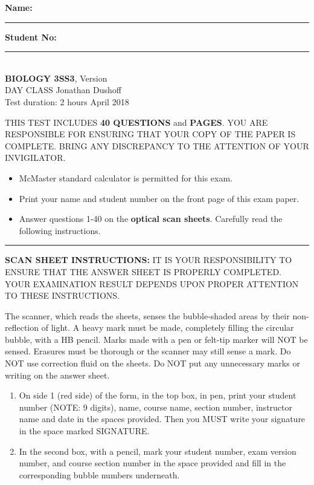 
\thispagestyle{empty}
\textbf{Name:} \rule{5cm}{1pt} \hfill \textbf{Student No:} \rule{5cm}{1pt} \\

\bigskip\noindent \hfill {\large {\bf BIOLOGY 3SS3}, Version \testver} \hspace*{\fill} \\
DAY CLASS  \hfill Jonathan Dushoff \\
Test duration: 2 hours \hfill April 2018

{\small

\medskip\noindent THIS TEST INCLUDES {\bf 40 QUESTIONS} and \textbf{\pageref{LastPage} PAGES}. YOU ARE RESPONSIBLE FOR ENSURING THAT YOUR COPY OF THE PAPER IS COMPLETE. BRING ANY DISCREPANCY TO THE ATTENTION OF YOUR INVIGILATOR. 

\begin{itemize}
\item McMaster standard calculator is permitted for this exam.
\item Print your name and student number on the front page of this exam paper.
\item Answer questions 1-40 on the \textbf{optical scan sheets}.  Carefully read the following instructions.
\end{itemize}
\hrule
\bigskip\textbf{SCAN SHEET INSTRUCTIONS:} 
IT IS YOUR RESPONSIBILITY TO ENSURE THAT THE ANSWER SHEET IS PROPERLY COMPLETED. YOUR EXAMINATION RESULT DEPENDS UPON PROPER ATTENTION TO THESE INSTRUCTIONS.

The scanner, which reads the sheets, senses the bubble-shaded areas by their non-reflection of light.  A heavy mark must be made, completely filling the circular bubble, with a HB pencil.  Marks made with a pen or felt-tip marker will NOT be sensed.  Erasures must be thorough or the scanner may still sense a mark.  Do NOT use correction fluid on the sheets.  Do NOT put any unnecessary marks or writing on the answer sheet.

\begin{enumerate}

\item On side 1 (red side) of the form, in the top box, in pen, print your student number (NOTE: 9 digits), name, course name, section number, instructor name and date in the spaces provided.  Then you MUST write your signature in the space marked SIGNATURE.

\item In the second box, with a pencil, mark your student number, exam version number, and course section number in the space provided and fill in the corresponding bubble numbers underneath.


\end{enumerate}}
